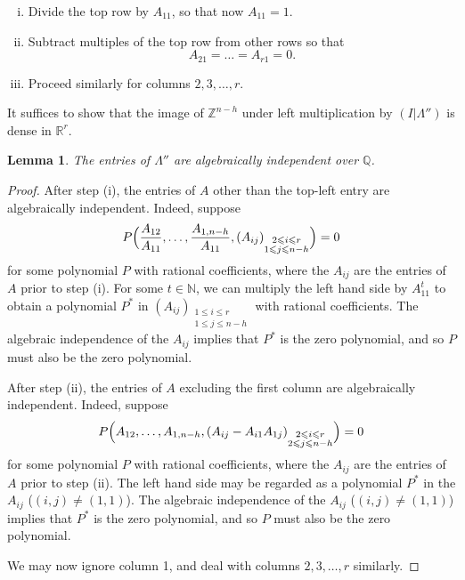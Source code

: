 \documentclass[12pt,reqno]{amsart}
\newtheorem{lemma}[thm]{Lemma}
\theoremstyle{definition}
\theoremstyle{remark}
\numberwithin{equation}{section}
\begin{document}
\begin{enumerate}[(i)]
\item Divide the top row by $A_{11}$, so that now $A_{11} = 1$.
\item Subtract multiples of the top row from other rows so that 
\[
A_{21} = \ldots = A_{r1} = 0.
\]
\item Proceed similarly for columns $2,3, \ldots, r$.
\end{enumerate}

It suffices to show that the image of ${\mathbb Z}^{n-h}$ under left multiplication by $(I | {{\Lambda}}'')$ is dense in ${\mathbb R}^r$.

\begin{lemma}
The entries of ${{\Lambda}}''$ are algebraically independent over ${\mathbb Q}$.
\end{lemma}

\begin{proof} After step (i), the entries of $A$ other than the top-left entry are algebraically independent. Indeed, suppose
\[
P \Bigl (\frac{A_{12}}{A_{11}}, \ldots, \frac{A_{1,n-h}}{A_{11}}, (A_{ij})_{\substack{2 {\leqslant} i {\leqslant} r \\ 1 {\leqslant} j {\leqslant} n-h}} \Bigr) = 0
\]
for some polynomial $P$ with rational coefficients, where the $A_{ij}$ are the entries of $A$ prior to step (i). For some $t \in {\mathbb N}$, we can multiply the left hand side by $A_{11}^t$ to obtain a polynomial $P^*$ in $(A_{ij})_{\substack{1 {\leqslant} i {\leqslant} r \\ 1 {\leqslant} j {\leqslant} n-h}}$ with rational coefficients. The algebraic independence of the $A_{ij}$ implies that $P^*$ is the zero polynomial, and so $P$ must also be the zero polynomial.

After step (ii), the entries of $A$ excluding the first column are algebraically independent. Indeed, suppose 
\[
P \Bigl(A_{12}, \ldots, A_{1,n-h}, (A_{ij} - A_{i1} A_{1j})_{\substack {2 {\leqslant} i {\leqslant} r \\ 2 {\leqslant} j {\leqslant} n-h}} \Bigr) = 0
\]
for some polynomial $P$ with rational coefficients, where the $A_{ij}$ are the entries of $A$ prior to step (ii). The left hand side may be regarded as a polynomial $P^*$ in the $A_{ij}$ ($(i,j) \ne (1,1)$). The algebraic independence of the $A_{ij}$ ($(i,j) \ne (1,1)$) implies that $P^*$ is the zero polynomial, and so $P$ must also be the zero polynomial. 

We may now ignore column 1, and deal with columns $2,3,\ldots,r$ similarly.
\end{proof}
\end{document}
